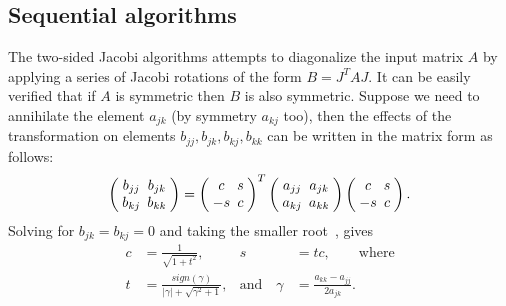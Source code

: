 \documentclass[10pt, conference, compsocconf]{IEEEtran}
\begin{document}
\subsection{Sequential algorithms}

The two-sided Jacobi algorithms attempts to diagonalize the input matrix $A$ by applying a series of Jacobi rotations of the form $B = J^T A J$. It can be easily verified that if $A$ is symmetric then $B$ is also symmetric. Suppose we need to annihilate the element $a_{jk}$ (by symmetry $a_{kj}$ too), then the effects of the transformation on elements $b_{jj}, b_{jk}, b_{kj}, b_{kk}$ can be written in the matrix form as follows:
\begin{align}
\setlength{\arraycolsep}{2.5pt}
  \left(\begin{array}{cc}
    b_{jj} & b_{jk} \\
    b_{kj} & b_{kk}
  \end{array} \right)
  =
  \left(\begin{array}{cc}
    c & s \\
    -s & c
  \end{array} \right)^T
  \left(\begin{array}{cc}
    a_{jj} & a_{jk} \\
    a_{kj} & a_{kk}
  \end{array} \right)
  \left(\begin{array}{cc}
    c & s \\
    -s & c
  \end{array} \right).
\end{align}
Solving for $b_{jk} = b_{kj} = 0$ and taking the smaller root~\cite{golub2012matrix}, gives 
\begin{align}
  c &= \frac{1}{\sqrt{1+t^2}}, & s&=tc, \qquad \text{where} \nonumber \\
  t &= \frac{sign(\gamma)}{|\gamma|+\sqrt{\gamma^2+1}}, & \text{and} \quad \gamma &= \frac{a_{kk} - a_{jj}}{2a_{jk}}.
\end{align}
\end{document}

